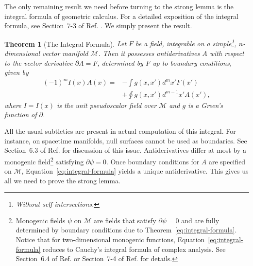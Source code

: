 \documentclass[twocolumn,notitlepage,nofootinbib,tightenlines]{revtex4-1}
\newtheorem{thm}{Theorem}[section]
\theoremstyle{definition}
\theoremstyle{remark}
\numberwithin{equation}{section}
\begin{document}
The only remaining result we need before turning to the strong lemma is the integral formula of geometric calculus. For a detailed exposition of the integral formula, see Section~7-3 of Ref. \cite{hestenes}. We simply present the result.
%
\begin{thm}[The Integral Formula]\label{thm:integral-formula}
    Let $F$ be a field, integrable on a simple\footnote{Without self-intersections.}, $n$-dimensional vector manifold $\mathcal{M}$. Then it possesses antiderivatives $A$ with respect to the vector derivative $\partial A = F$, determined by $F$ up to boundary conditions, given by
%
    \begin{align}\label{eq:integral-formula}
        (-1)^m I(x) A(x) = &- \int g(x, x') d^m x' F(x') \\
        &+ \oint g(x, x') d^{m-1} x' A(x'),\nonumber
    \end{align}
%
    where $I=I(x)$ is the unit pseudoscalar field over $\mathcal{M}$ and $g$ is a Green's function of $\partial$.
\end{thm}
%
All the usual subtleties are present in actual computation of this integral. For instance, on spacetime manifolds, null surfaces cannot be used as boundaries. See Section~6.3 of Ref. \cite{doran} for discussion of this issue. Antiderivatives differ at most by a monogenic field\footnote{Monogenic fields $\psi$ on $\mathcal{M}$ are fields that satisfy $\partial \psi = 0$ and are fully determined by boundary conditions due to Theorem~\ref{eq:integral-formula}. Notice that for two-dimensional monogenic functions, Equation~\ref{eq:integral-formula} reduces to Cauchy's integral formula of complex analysis. See Section~6.4 of Ref. \cite{doran} or Section~7-4 of Ref. \cite{hestenes} for details.} satisfying $\partial \psi = 0$. Once boundary conditions for $A$ are specified on $\mathcal{M}$, Equation~\ref{eq:integral-formula} yields a unique antiderivative. This gives us all we need to prove the strong lemma.
\end{document}
